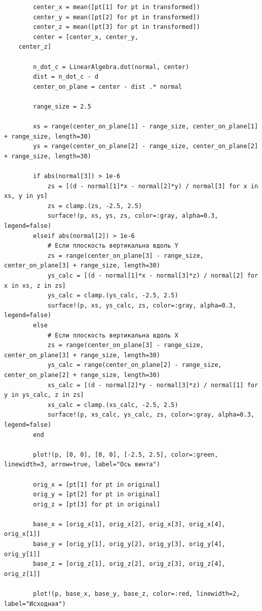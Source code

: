 \begin{verbatim}
        center_x = mean([pt[1] for pt in transformed])
        center_y = mean([pt[2] for pt in transformed])
        center_z = mean([pt[3] for pt in transformed])
        center = [center_x, center_y,
    center_z]

        n_dot_c = LinearAlgebra.dot(normal, center)
        dist = n_dot_c - d
        center_on_plane = center - dist .* normal

        range_size = 2.5

        xs = range(center_on_plane[1] - range_size, center_on_plane[1] + range_size, length=30)
        ys = range(center_on_plane[2] - range_size, center_on_plane[2] + range_size, length=30)

        if abs(normal[3]) > 1e-6
            zs = [(d - normal[1]*x - normal[2]*y) / normal[3] for x in xs, y in ys]
            zs = clamp.(zs, -2.5, 2.5)
            surface!(p, xs, ys, zs, color=:gray, alpha=0.3, legend=false)
        elseif abs(normal[2]) > 1e-6
            # Если плоскость вертикальна вдоль Y
            zs = range(center_on_plane[3] - range_size, center_on_plane[3] + range_size, length=30)
            ys_calc = [(d - normal[1]*x - normal[3]*z) / normal[2] for x in xs, z in zs]
            ys_calc = clamp.(ys_calc, -2.5, 2.5)
            surface!(p, xs, ys_calc, zs, color=:gray, alpha=0.3, legend=false)
        else
            # Если плоскость вертикальна вдоль X
            zs = range(center_on_plane[3] - range_size, center_on_plane[3] + range_size, length=30)
            ys_calc = range(center_on_plane[2] - range_size, center_on_plane[2] + range_size, length=30)
            xs_calc = [(d - normal[2]*y - normal[3]*z) / normal[1] for y in ys_calc, z in zs]
            xs_calc = clamp.(xs_calc, -2.5, 2.5)
            surface!(p, xs_calc, ys_calc, zs, color=:gray, alpha=0.3, legend=false)
        end

        plot!(p, [0, 0], [0, 0], [-2.5, 2.5], color=:green, linewidth=3, arrow=true, label="Ось винта")

        orig_x = [pt[1] for pt in original]
        orig_y = [pt[2] for pt in original]
        orig_z = [pt[3] for pt in original]

        base_x = [orig_x[1], orig_x[2], orig_x[3], orig_x[4], orig_x[1]]
        base_y = [orig_y[1], orig_y[2], orig_y[3], orig_y[4], orig_y[1]]
        base_z = [orig_z[1], orig_z[2], orig_z[3], orig_z[4], orig_z[1]]

        plot!(p, base_x, base_y, base_z, color=:red, linewidth=2, label="Исходная")


\end{verbatim}
